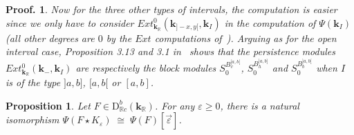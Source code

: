 \documentclass[a4paper, english, 11pt]{article}
\newcommand{\kk}[0]{\textbf{k}}
\newcommand{\0}{\vec{0}}
\newcommand{\R}[0]{\mathbb{R}}
\newcommand{\D}[0]{\text{D}}
\newtheorem{prop}{Proposition}[section]
\newtheorem*{pf}{Proof.} }
\begin{document}
\begin{pf}
\smallskip

Now for the three other types of intervals, the computation is easier since we only have to consider $Ext^0_{\kk_\R}\left( \kk_{]-x,y[}, \kk_{I }\right)$ in the computation of $\Psi(\kk_I)$ (all other degrees are $0$ by the $Ext$ computations of~\cite{Berk18}). Arguing as for the open interval case, Proposition 3.13 and 3.1 in~\cite{Berk18} shows that the persistence modules $Ext^0_{\kk_\R}\left( \kk_{-}, \kk_{I }\right)$ are respectively the block modules $S_0^{B_v^{[a,b[}}$, $S_0^{B_h^{]a,b]}}$ and 
$S_0^{B_b^{]a,b[}}$ when $I$ is of the type $]a, b]$, $[a, b[$ or $[a,b]$. 
\end{pf}

\begin{prop}\label{P:Psipreservesinterl}Let $F \in \D^b_{\R c}(\kk_\R)$. For any $\varepsilon \geq 0$, there is a natural isomorphism 
$ \Psi(F \star K_{\varepsilon}) \; \cong \; \Psi(F)[\vec{\varepsilon}]$.
\end{prop}
\end{document}
